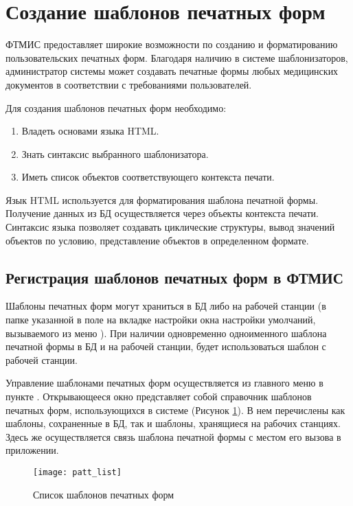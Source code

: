 \newpage
\normalsize
\section{Создание шаблонов печатных форм}

ФТМИС предоставляет широкие возможности по созданию и форматированию пользовательских печатных форм. Благодаря наличию в системе шаблонизаторов, администратор системы может создавать печатные формы любых медицинских документов в соответствии с требованиями пользователей.

Для создания шаблонов печатных форм необходимо:
\begin{enumerate}
 \item Владеть основами языка HTML.
 \item Знать синтаксис выбранного шаблонизатора.
 \item Иметь список объектов соответствующего контекста печати.
\end{enumerate}
 
Язык HTML используется для форматирования шаблона печатной формы. Получение данных из БД осуществляется через объекты контекста печати. Синтаксис языка позволяет создавать циклические структуры, вывод значений объектов по условию, представление объектов в определенном формате.

\subsection{Регистрация шаблонов печатных форм в ФТМИС} \label{patt_add}

Шаблоны печатных форм могут храниться в БД либо на рабочей станции (в папке указанной в поле  на вкладке  настройки окна настройки умолчаний, вызываемого из  меню ). При наличии одновременно одноименного шаблона печатной формы в БД и на рабочей станции, будет использоваться шаблон с рабочей станции.

Управление шаблонами печатных форм осуществляется из главного меню в пункте . Открывающееся окно представляет собой  справочник шаблонов печатных форм, использующихся в системе (Рисунок \ref{img_patt_list}). В нем перечислены как шаблоны, сохраненные в БД, так и шаблоны, хранящиеся на рабочих станциях. Здесь же осуществляется связь шаблона печатной формы с местом его вызова в приложении.

\begin{figure}[ht]\centering
 \texttt{[image: patt\_list]}
 \caption{Список шаблонов печатных форм}
 \label{img_patt_list}
\end{figure}

